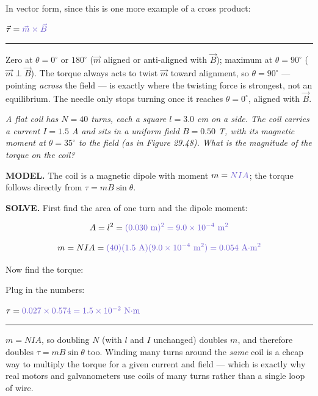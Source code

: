 \documentclass[12pt]{article}
\newcommand{\eqline}[2][-0.5mm]{%
  \par\vspace{1mm}\noindent #2\par\vspace{#1}%
  \noindent\textcolor{rulehue}{\rule{\linewidth}{0.5pt}}\par\vspace{4mm}%
}
\newcommand{\ANS}[1]{\textcolor{accent}{#1}}
\begin{document}
\result[1.8cm]{$\tau = \ANS{mB\sin\theta}$}

In vector form, since this is one more example of a cross product:

\eqline[0.2cm]{$\vec\tau = \ANS{\vec m\times\vec B}$}


{\small\color{accent} Zero at $\theta=0^\circ$ or $180^\circ$ ($\vec m$
aligned or anti-aligned with $\vec B$); maximum at $\theta=90^\circ$
($\vec m\perp\vec B$). The torque always acts to twist $\vec m$ toward
alignment, so $\theta=90^\circ$ --- pointing \emph{across} the field
--- is exactly where the twisting force is strongest, not an
equilibrium. The needle only stops turning once it reaches
$\theta=0^\circ$, aligned with $\vec B$.}


\textit{A flat coil has $N=40$ turns, each a square $l=3.0$ cm on a
side. The coil carries a current $I=1.5$ A and sits in a uniform field
$B=0.50$ T, with its magnetic moment at $\theta=35^\circ$ to the field
(as in Figure 29.48). What is the magnitude of the torque on the
coil?}

\textbf{MODEL.} The coil is a magnetic dipole with moment
$m=\ANS{NIA}$; the torque follows directly from $\tau=mB\sin\theta$.

\textbf{SOLVE.} First find the area of one turn and the dipole moment:

\[
A = l^2 = \ANS{(0.030\text{ m})^2 = 9.0\times10^{-4}\text{ m}^2}
\]

\[
m = NIA = \ANS{(40)(1.5\text{ A})(9.0\times10^{-4}\text{ m}^2) =
0.054\text{ A}{\cdot}\text{m}^2}
\]

Now find the torque:

\result[1.8cm]{$\tau = mB\sin\theta = \ANS{(0.054)(0.50)\sin35^\circ}$}

Plug in the numbers:

\eqline[0.2cm]{$\tau = \ANS{0.027\times0.574 = 1.5\times10^{-2}\text{
N}{\cdot}\text{m}}$}


{\small\color{accent} $m=NIA$, so doubling $N$ (with $l$ and $I$
unchanged) doubles $m$, and therefore doubles $\tau=mB\sin\theta$ too.
Winding many turns around the \emph{same} coil is a cheap way to
multiply the torque for a given current and field --- which is exactly
why real motors and galvanometers use coils of many turns rather than
a single loop of wire.}
\end{document}
